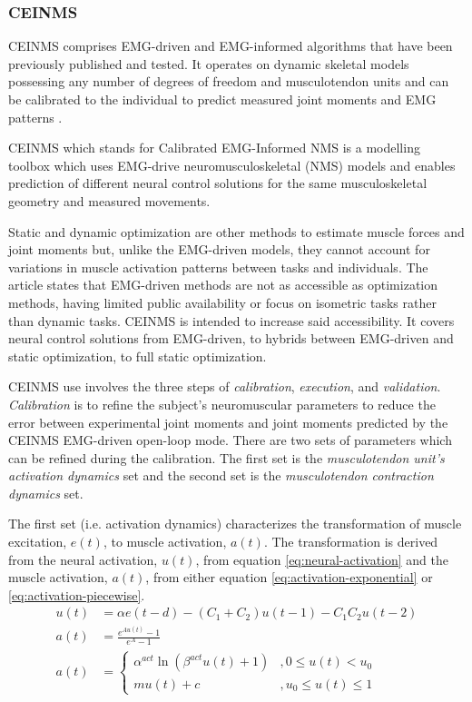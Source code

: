 \subsubsection{CEINMS}
CEINMS comprises EMG-driven and EMG-informed algorithms that have been previously published and tested. 
It operates on dynamic skeletal models possessing any number of degrees of freedom and musculotendon units and can be calibrated to the individual to predict measured joint moments and EMG patterns \cite{Pizzolato2015}.

CEINMS which stands for Calibrated EMG-Informed NMS is a modelling toolbox which uses EMG-drive neuromusculoskeletal (NMS) models and enables prediction of different neural control solutions for the same musculoskeletal geometry and measured movements. 

Static and dynamic optimization are other methods to estimate muscle forces and joint moments but, unlike the EMG-driven models, they cannot account for variations in muscle activation patterns between tasks and individuals.
The article states that EMG-driven methods are not as accessible as optimization methods, having limited public availability or focus on isometric tasks rather than dynamic tasks. 
CEINMS is intended to increase said accessibility. 
It covers neural control solutions from EMG-driven, to hybrids between EMG-driven and static optimization, to full static optimization.

CEINMS use involves the three steps of \textit{calibration}, \textit{execution}, and \textit{validation}. \textit{Calibration} is to refine the subject's neuromuscular parameters to reduce the error between experimental joint moments and joint moments predicted by the CEINMS EMG-driven open-loop mode. There are two sets of parameters which can be refined during the calibration. The first set is the \textit{musculotendon unit's activation dynamics} set and the second set is the \textit{musculotendon contraction dynamics} set. 

The first set (i.e. activation dynamics) characterizes the transformation of muscle excitation, $e(t)$, to muscle activation, $a(t)$. The transformation is derived from the neural activation, $u(t)$, from equation \ref{eq:neural-activation} and the muscle activation, $a(t)$, from either equation \ref{eq:activation-exponential} or \ref{eq:activation-piecewise}.
\begin{align}
\label{eq:neural-activation}
    u(t) &= \alpha e(t-d) - (C_1 + C_2)u(t-1) - C_1 C_2 u(t-2) \\
\label{eq:activation-exponential}
    a(t) &= \frac{e^{Au(t)} - 1}{e^A - 1}\\
\label{eq:activation-piecewise}
    a(t) &= \begin{cases}
        \alpha^{act}\ln \left( \beta^{act}u(t)+1 \right) &, 0\leq u(t) < u_0\\
        mu(t) + c &, u_0 \leq u(t) \leq 1
    \end{cases}
\end{align}

